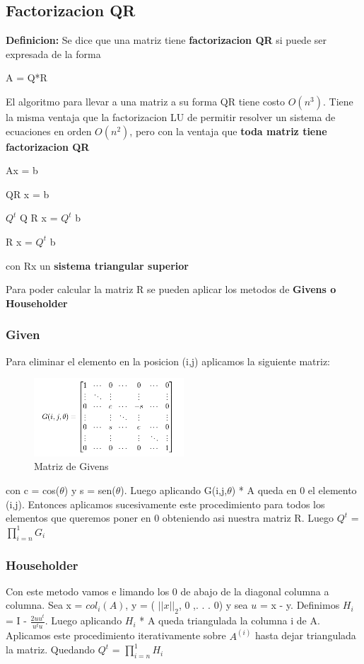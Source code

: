 \subsection{Factorizacion QR}
\textbf{Definicion:} Se dice que una matriz tiene \textbf{factorizacion QR} si puede ser expresada de la forma
\begin{center}
A = Q*R
\end{center}

El algoritmo para llevar a una matriz a su forma QR tiene costo $O(n^3).$ Tiene la misma ventaja que la factorizacion LU de permitir resolver un sistema de ecuaciones en orden $O(n^2)$, pero con la ventaja que \textbf{toda matriz tiene factorizacion QR}

\begin{center}
Ax = b

QR x = b

$Q^t$ Q R x = $Q^t$ b

R x = $Q^t$ b

con Rx un \textbf{sistema triangular superior}
\end{center}

Para poder calcular la matriz R se pueden aplicar los metodos de \textbf{Givens o Householder}

\subsubsection{Given}

Para eliminar el elemento en la posicion (i,j) aplicamos la siguiente matriz:

\begin{figure}[H] 
\begin{center}
\includegraphics[width=0.5\textwidth]{img/givens.png} 
\caption{Matriz de Givens} 
\end{center}
\end{figure}

con c = cos($\theta$) y s = sen($\theta$). Luego aplicando G(i,j,$\theta$) * A queda en 0 el elemento (i,j). Entonces aplicamos sucesivamente este procedimiento para todos los elementos que queremos poner en 0 obteniendo asi nuestra matriz R. Luego $Q^t$ =  $\prod_{i = n}^1 G_i $

\subsubsection{Householder}

Con este metodo vamos e limando los 0 de abajo de la diagonal columna a columna.
Sea x = $col_i(A)$, y = ( $||x||_2$, 0 ,. . . 0) y sea $u$ = x - y. Definimos $H_i$ = I -  $ \frac{2uu^t}{u^tu} $.
Luego aplicando $H_i$ * A queda triangulada la columna i de A. Aplicamos este procedimiento iterativamente sobre $A^{(i)}$ hasta dejar triangulada la matriz. 
Quedando $Q^t$ =  $\prod_{i = n}^1 H_i $
